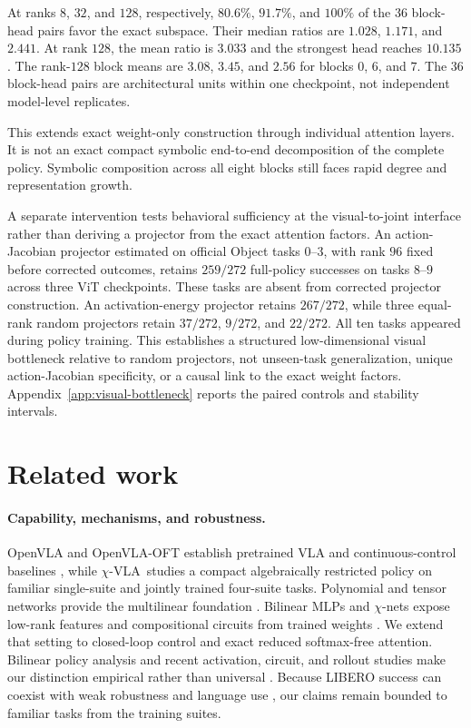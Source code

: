 \documentclass{article}
\newcommand{\chivla}{$\chi$-VLA}
\begin{document}
At ranks $8$, $32$, and $128$, respectively, $80.6\%$, $91.7\%$, and $100\%$ of the $36$
block-head pairs favor the exact subspace. Their median ratios are $1.028$, $1.171$, and
$2.441$. At rank $128$, the mean ratio is $3.033$ and the strongest head reaches $10.135$.
The rank-$128$ block means are $3.08$, $3.45$, and $2.56$ for blocks $0$, $6$, and $7$.
The $36$ block-head pairs are architectural units within one checkpoint, not independent
model-level replicates.

This extends exact weight-only construction through individual attention layers. It is not an
exact compact symbolic end-to-end decomposition of the complete policy. Symbolic composition across all eight blocks
still faces rapid degree and representation growth.

A separate intervention tests behavioral sufficiency at the visual-to-joint interface rather
than deriving a projector from the exact attention factors. An action-Jacobian projector estimated
on official Object tasks $0$--$3$, with rank $96$ fixed before corrected outcomes, retains $259/272$ full-policy
successes on tasks $8$--$9$ across three ViT checkpoints. These tasks are absent from corrected
projector construction. An activation-energy
projector retains $267/272$, while three equal-rank random projectors retain $37/272$, $9/272$, and
$22/272$. All ten tasks appeared during policy training. This establishes a structured
low-dimensional visual bottleneck relative to random projectors, not unseen-task generalization,
unique action-Jacobian specificity, or a causal link to the exact weight factors.
Appendix~\ref{app:visual-bottleneck} reports the paired controls and stability intervals.

\section{Related work}

\paragraph{Capability, mechanisms, and robustness.}
OpenVLA and OpenVLA-OFT establish pretrained VLA and continuous-control baselines
\cite{openvla,openvlaoft}, while \chivla\ studies a compact algebraically restricted policy on
familiar single-suite and jointly trained four-suite tasks.
Polynomial and tensor networks provide the multilinear foundation
\cite{koldabader,stoudenmire,chrysos}. Bilinear MLPs and $\chi$-nets expose low-rank features and
compositional circuits from trained weights \cite{pearce,chinets}. We extend that setting to
closed-loop control and exact reduced softmax-free attention. Bilinear policy analysis and recent
activation, circuit, and rollout studies make our distinction empirical rather than universal
\cite{bimpala,haonsteering,sparsecircuits,causalreduction}. Because LIBERO success can coexist with
weak robustness and language use \cite{liberopro,liberocf,liberopara}, our claims remain bounded
to familiar tasks from the training suites.
\end{document}
